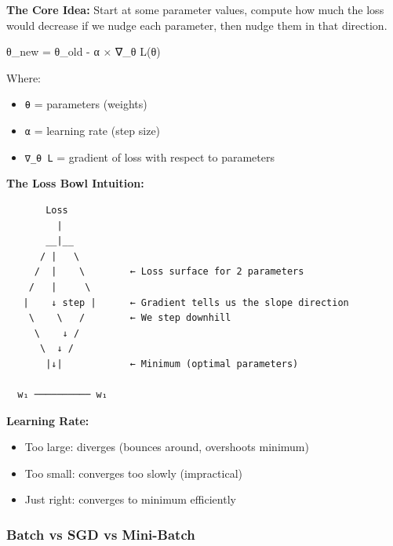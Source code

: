 \documentclass[11pt]{article}
\providecommand{\tightlist}{\setlength{\itemsep}{1pt}\setlength{\parskip}{0pt}}
\newenvironment{Shaded}{\begin{snugshade}}{\end{snugshade}}
\newcommand{\NormalTok}[1]{\textcolor[rgb]{0.81,0.81,0.76}{#1}}
\newcommand{\OperatorTok}[1]{\textcolor[rgb]{0.81,0.81,0.76}{#1}}
\begin{document}
\textbf{The Core Idea:} Start at some parameter values, compute how much the loss would decrease if we nudge each parameter, then nudge them in that direction.


\begin{Shaded}
\begin{Highlighting}[]
\NormalTok{θ\_new }\OperatorTok{=}\NormalTok{ θ\_old }\OperatorTok{{-}}\NormalTok{ α × ∇\_θ L(θ)}
\end{Highlighting}
\end{Shaded}

Where:

\begin{itemize}
\tightlist
\item
  \texttt{θ} = parameters (weights)
\item
  \texttt{α} = learning rate (step size)
\item
  \texttt{∇\_θ\ L} = gradient of loss with respect to parameters
\end{itemize}

\textbf{The Loss Bowl Intuition:}

\setcodelang{}

\begin{verbatim}
       Loss
         |
       __|__
      / |   \
     /  |    \        ← Loss surface for 2 parameters
    /   |     \
   |    ↓ step |      ← Gradient tells us the slope direction
    \    \   /        ← We step downhill
     \    ↓ /
      \  ↓ /
       |↓|            ← Minimum (optimal parameters)

  w₁ ────────── w₁
\end{verbatim}

\textbf{Learning Rate:}

\begin{itemize}
\tightlist
\item
  Too large: diverges (bounces around, overshoots minimum)
\item
  Too small: converges too slowly (impractical)
\item
  Just right: converges to minimum efficiently
\end{itemize}

\subsubsection{Batch vs SGD vs Mini-Batch}\label{batch-vs-sgd-vs-mini-batch}
\end{document}
